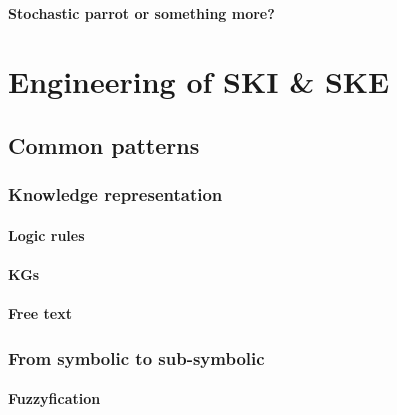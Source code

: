 \documentclass[12pt,a4paper,openright,twoside]{book}
\begin{document}
\subsection{Stochastic parrot or something more?}\label{subsec:stochastic-parrot-or-something-more}


\part{Engineering of \ac{SKI} \& \ac{SKE}}\label{part:engineering-of-ski-ske}


\chapter{Common patterns}\label{ch:common-patterns}

\section{Knowledge representation}\label{sec:knowledge-representation}

\subsection{Logic rules}\label{subsec:logic-rules}

\subsection{\Aclp{KG}}\label{subsec:kg}

\subsection{Free text}\label{subsec:free-text}

\section{From symbolic to sub-symbolic}\label{sec:from-symbolic-to-sub-symbolic}

\subsection{Fuzzyfication}\label{subsec:fuzzyfication}
\end{document}
